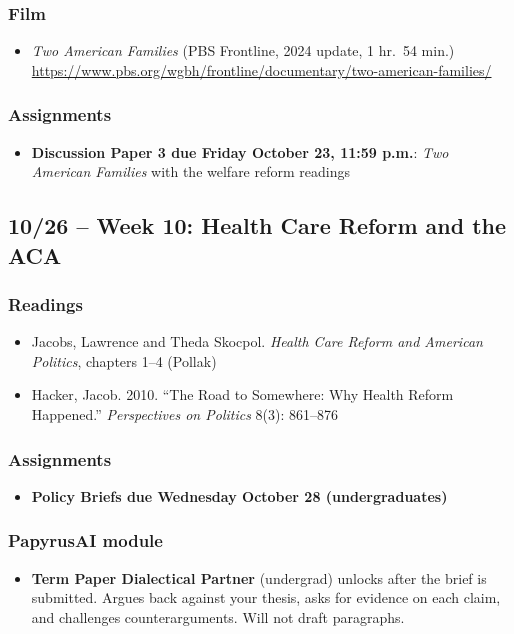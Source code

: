 \documentclass[12pt]{article}
\begin{document}
    \subsubsection*{Film}
        \begin{itemize}
            \item \emph{Two American Families} (PBS Frontline, 2024 update, 1 hr.\ 54 min.) \\
            \url{https://www.pbs.org/wgbh/frontline/documentary/two-american-families/}
        \end{itemize}
    \subsubsection*{Assignments}
        \begin{itemize}
            \item \textbf{Discussion Paper 3 due Friday October 23, 11:59 p.m.}: \emph{Two American Families} with the welfare reform readings
        \end{itemize}

\subsection*{10/26 -- Week 10: Health Care Reform and the ACA}
    \subsubsection*{Readings}
        \begin{itemize}
            \item Jacobs, Lawrence and Theda Skocpol. \emph{Health Care Reform and American Politics}, chapters 1--4 (Pollak)
            \item Hacker, Jacob. 2010. ``The Road to Somewhere: Why Health Reform Happened.'' \emph{Perspectives on Politics} 8(3): 861--876
        \end{itemize}
    \subsubsection*{Assignments}
        \begin{itemize}
            \item \textbf{Policy Briefs due Wednesday October 28 (undergraduates)}
        \end{itemize}
    \subsubsection*{PapyrusAI module}
        \begin{itemize}
            \item \textbf{Term Paper Dialectical Partner} (undergrad) unlocks after the brief is submitted. Argues back against your thesis, asks for evidence on each claim, and challenges counterarguments. Will not draft paragraphs.
        \end{itemize}
\end{document}
